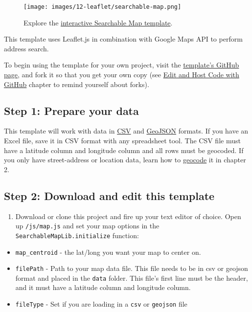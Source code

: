\documentclass[
  english,
]{book}
\providecommand{\tightlist}{%
  \setlength{\itemsep}{0pt}\setlength{\parskip}{0pt}}
\begin{document}
\begin{figure}
\centering
\texttt{[image: images/12-leaflet/searchable-map.png]}
\caption{\label{fig:searchable-map}Explore the \href{https://searchable-map-template-csv.netlify.app/}{interactive Searchable Map template}.}
\end{figure}

This template uses Leaflet.js in combination with Google Maps API to perform
address search.

To begin using the template for your own project, visit the \href{https://github.com/HandsOnDataViz/searchable-map-template-csv}{template's GitHub page},
and fork it so that you get your own copy (see \href{github.html}{Edit and Host Code with GitHub}
chapter to remind yourself about forks).

\hypertarget{step-1-prepare-your-data}{%
\subsection*{Step 1: Prepare your data}\label{step-1-prepare-your-data}}

This template will work with data in \href{csv.html}{CSV} and \href{geojson.html}{GeoJSON} formats. If you have an Excel file, save it in CSV format with any spreadsheet tool. The CSV file must have a latitude column and longitude column and all rows must be geocoded. If you only have street-address or location data, learn how to \href{geocode.html}{geocode} it in chapter 2.

\hypertarget{step-2-download-and-edit-this-template}{%
\subsection*{Step 2: Download and edit this template}\label{step-2-download-and-edit-this-template}}

\begin{enumerate}
\def\labelenumi{\arabic{enumi}.}
\tightlist
\item
  Download or clone this project and fire up your text editor of choice. Open up \texttt{/js/map.js} and set your map options in the \texttt{SearchableMapLib.initialize} function:
\end{enumerate}

\begin{itemize}
\tightlist
\item
  \texttt{map\_centroid} - the lat/long you want your map to center on.
\item
  \texttt{filePath} - Path to your map data file. This file needs to be in csv or geojson format and placed in the \texttt{data} folder. This file's first line must be the header, and it must have a latitude column and longitude column.
\item
  \texttt{fileType} - Set if you are loading in a \texttt{csv} or \texttt{geojson} file
\end{itemize}
\end{document}
